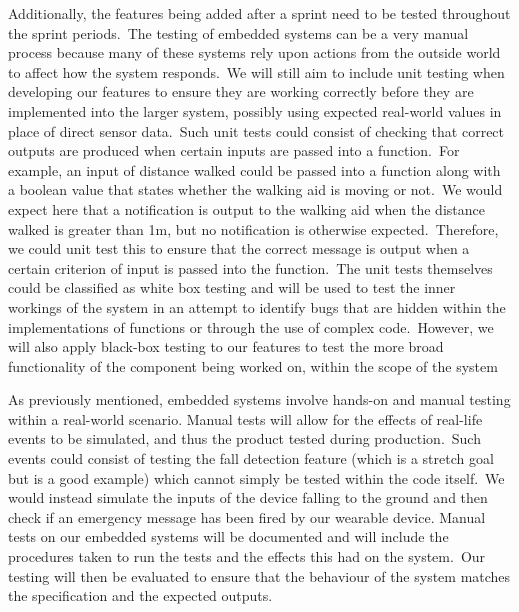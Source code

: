         Additionally, the features being added after a sprint need to be tested throughout the sprint
        periods.\ The testing of embedded systems can be a very manual process because many of these systems
        rely upon actions from the outside world to affect how the system responds.\ We will still aim to include unit
        testing when developing our features to ensure they are working correctly before they are implemented into the
        larger system, possibly using expected real-world values in place of direct sensor data.\ Such unit tests could
        consist of checking that correct outputs are produced when certain inputs are passed into a function.\ For
        example, an input of distance walked could be passed into a function along with a boolean value that states
        whether the walking aid is moving or not.\ We would expect here that a notification is output to the walking aid
        when the distance walked is greater than 1m, but no notification is otherwise expected.\ Therefore, we could unit
        test this to ensure that the correct message is output when a certain criterion of input is passed into the
        function.\ The unit tests themselves could be classified as white box testing and will be used to test the inner
        workings of the system in an attempt to identify bugs that are hidden within the implementations of functions or
        through the use of complex code.\ However, we will also apply black-box testing to our features to test the more
        broad functionality of the component being worked on, within the scope of the system

        As previously mentioned, embedded systems involve hands-on and manual testing within a real-world scenario.
        Manual tests will allow for the effects of real-life events to be simulated, and thus the product tested during
        production.\ Such events could consist of testing the fall detection feature (which is a stretch goal but is a
        good example) which cannot simply be tested within the code itself.\ We would instead simulate the inputs of the
        device falling to the ground and then check if an emergency message has been fired by our wearable device.
        Manual tests on our embedded systems will be documented and will include the procedures taken to run the tests
        and the effects this had on the system.\ Our testing will then be evaluated to ensure that the behaviour of the
        system matches the specification and the expected outputs.
